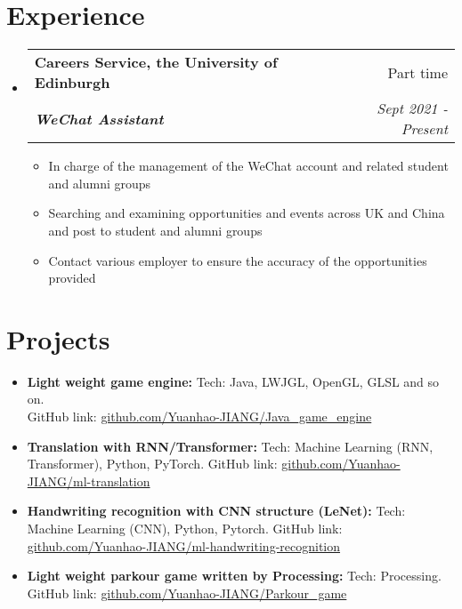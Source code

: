 \documentclass[12pt, a4paper]{article}
\makeatletter
\newcommand{\resumeSection}[1]{
    \section*{#1}
}
\newcommand{\resumeSectionItm}[4]{
\item
    \begin{tabular*}{0.96\textwidth}{@{}l@{\extracolsep{\fill}}r@{}}
        \textbf{#1} & #2 \\
        \textit{\textbf{#3}} & \textit{#4}
    \end{tabular*}
}
\newcommand{\resumeSectionSubItmI}[1]{
\item {#1}\vspace{-2mm}
}
\newcommand{\resumeSectionSubItmII}[2]{
\item \textbf{#1: }{#2}\vspace{-2mm}
}
\makeatother
\begin{document}
\resumeSection{Experience}
\begin{itemize}[leftmargin=*]
    \resumeSectionItm
    {Careers Service, the University of Edinburgh}{Part time}
    {WeChat Assistant}{Sept 2021 - Present}
    \vspace{-2mm}
    \begin{itemize}[leftmargin=*]
        \resumeSectionSubItmI{In charge of the management of the WeChat account and related student and alumni groups}
        \resumeSectionSubItmI
        {Searching and examining opportunities and events across UK and China and post to student and alumni groups}
        \resumeSectionSubItmI{Contact various employer to ensure the accuracy of the opportunities provided}
    \end{itemize}
\end{itemize}
\vspace{-2.5mm}

\resumeSection{Projects}
\vspace{1mm}
\begin{itemize}[leftmargin=*]
    \resumeSectionSubItmII{Light weight game engine}{Tech: Java, LWJGL, OpenGL, GLSL and so on.\\
        GitHub link: 
        \href{https://github.com/Yuanhao-JIANG/Java\_game\_engine}{github.com/Yuanhao-JIANG/Java\_game\_engine}}
    \resumeSectionSubItmII{Translation with RNN/Transformer}{Tech: Machine Learning (RNN, Transformer), Python, 
        PyTorch. 
        GitHub link: \href{https://github.com/Yuanhao-JIANG/ml-translation}{github.com/Yuanhao-JIANG/ml-translation}}
    \resumeSectionSubItmII{Handwriting recognition with CNN structure (LeNet)}{Tech: Machine Learning (CNN), Python, 
        Pytorch. GitHub link: \href{https://github.com/Yuanhao-JIANG/ml-handwriting-recognition}
        {github.com/Yuanhao-JIANG/ml-handwriting-recognition}}
    \resumeSectionSubItmII{Light weight parkour game written by Processing}{Tech: Processing.\\
        GitHub link: \href{https://github.com/Yuanhao-JIANG/Parkour_game}{github.com/Yuanhao-JIANG/Parkour\_game}}
\end{itemize}
\end{document}
